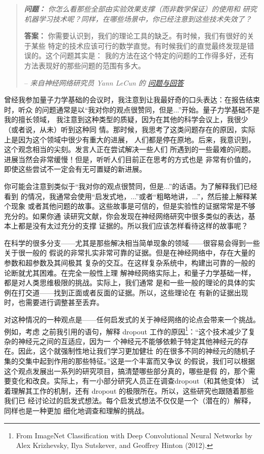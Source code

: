 \begin{quote}
{\itshape \textbf{问题：} 你怎么看那些全部由实验效果支撑（而非数学保证）的使用和
  研究机器学习技术呢？同样，在哪些场景中，你已经注意到这些技术失效了？}

\textbf{答案：} 你需要认识到，我们的理论工具的缺乏。有时候，我们有很好的关于某些
特定的技术应该可行的数学直觉。有时候我们的直觉最终发现是错误的。这个问题其实是：
我的方法在这个特定的问题的工作得多好，还有方法表现好的那些问题的范围有多大。

-- {\itshape 来自神经网络研究员 Yann LeCun 的%
  \href{http://www.reddit.com/r/MachineLearning/comments/25lnbt/ama_yann_lecun/chivdv7}{
    问题与回答}}
\end{quote}

曾经我参加量子力学基础的会议时，我注意到让我最好奇的口头表达：在报告结束时，听众
的问题通常是以“我对你的观点很赞同，但是...”开始。量子力学基础不是我的擅长领域，
我注意到这种类型的质疑，因为在其他的科学会议上，我很少（或者说，从未）听到这种同
情。那时候，我思考了这类问题存在的原因，实际上是因为这个领域中很少有重大的进展，
人们都是停在原地。后来，我意识到，这个观念相当的尖刻。发言人正在尝试解决一些人们
所遇到的一些最难的问题。进展当然会非常缓慢！但是，听听人们目前正在思考的方式也是
非常有价值的，即使这些尝试不一定会有无可置疑的新进展。

你可能会注意到类似于“我对你的观点很赞同，但是...”的话语。为了解释我们已经看到
的情况，我通常会使用“启发式地，...”或者“粗略地讲，...”，然后接上解释某个现象
或者其他问题的故事。这些故事是可信的，但是实验性的证据常常是不够充分的。如果你通
读研究文献，你会发现在神经网络研究中很多类似的表达，基本上都是没有太过充分的支撑
证据的。所以我们应该怎样看待这样的故事呢？

在科学的很多分支——尤其是那些解决相当简单现象的领域——很容易会得到一些关于很一般的
假说的非常扎实非常可靠的证据。但是在神经网络中，存在大量的参数和超参数及其间极其
复杂的交互。在这样复杂系统中，构建出可靠的一般的论断就尤其困难。在完全一般性上理
解神经网络实际上，和量子力学基础一样，都是对人类思维极限的挑战。实际上，我们通常
是和一些一般的理论的具体的实例在打交道——找到正面或者反面的证据。所以，这些理论在
有新的证据出现时，也需要进行调整甚至丢弃。

对这种情况的一种观点是——任何启发式的关于神经网络的论点会带来一个挑战。例如，考虑
之前我引用的语句，解释 dropout 工作的原因\footnote{From ImageNet Classification
  with Deep Convolutional Neural Networks by Alex Krizhevsky, Ilya Sutskever,
  and Geoffrey Hinton (2012).}：“这个技术减少了复杂的神经元之间的互适应，因为一
个神经元不能够依赖于特定其他神经元的存在。因此，这个就强制性地让我们学习更加健壮
的在很多不同的神经元的随机子集的交集中起到作用的那些特征。”这是一个丰富而又争议
的假说，我们可以根据这个观点发展出一系列的研究项目，搞清楚哪些部分真的，哪些是假
的，那个需要变化和改良。实际上，有一小部分研究人员正在调查dropout（和其他变体）
试着理解其工作的机制，还有 dropout 的极限所在。所以，这些研究也跟随着那些我们已
经讨论过的启发式想法。每个启发式想法不仅仅是一个（潜在的）解释，同样也是一种更加
细化地调查和理解的挑战。

